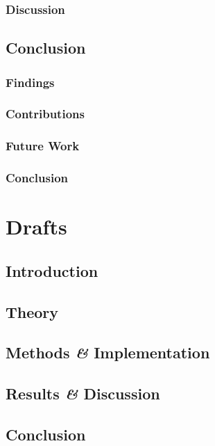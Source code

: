 \documentclass[
  10pt,
  b5paper,
  oneside
]{thesis}
\begin{document}
      \section{Discussion}      

    \chapter{Conclusion}
      \section{Findings}      
      \section{Contributions}      
      \section{Future Work}      
      \section{Conclusion}      



    \part{Drafts}

    \chapter{Introduction}
    
    
    \chapter{Theory}
    
    
    \chapter{Methods \emph{\&} Implementation}
    
    
    \chapter{Results \emph{\&} Discussion}
    
    
    \chapter{Conclusion}
    
    
    
  \backmatter
    
    \begin{appendices}
      
    \end{appendices}
    
\end{document}

